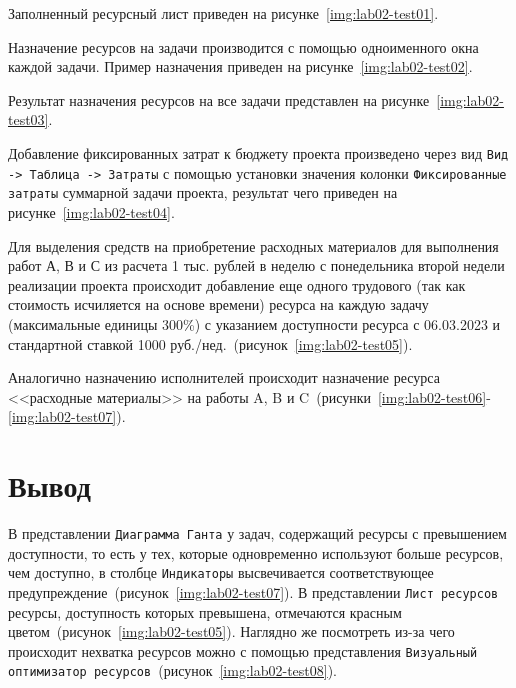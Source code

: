 Заполненный ресурсный лист приведен на рисунке~\ref{img:lab02-test01}.


Назначение ресурсов на задачи производится с помощью одноименного окна каждой
задачи. Пример назначения приведен на рисунке~\ref{img:lab02-test02}.


Результат назначения ресурсов на все задачи представлен на
рисунке~\ref{img:lab02-test03}.


Добавление фиксированных затрат к бюджету проекта произведено через вид
\texttt{Вид -> Таблица -> Затраты} с помощью установки значения колонки
\texttt{Фиксированные затраты} суммарной задачи проекта, результат чего
приведен на рисунке~\ref{img:lab02-test04}.


Для выделения средств на приобретение расходных материалов для выполнения работ
А, В и С из расчета 1 тыс. рублей в неделю с понедельника второй недели
реализации проекта происходит добавление еще одного трудового (так как
стоимость исчиляется на основе времени) ресурса на каждую задачу (максимальные
единицы 300\%) с указанием доступности ресурса с 06.03.2023 и стандартной
ставкой 1000 руб./нед.~(рисунок~\ref{img:lab02-test05}).


Аналогично назначению исполнителей происходит назначение ресурса <<расходные
материалы>> на работы A, B и
C~(рисунки~\ref{img:lab02-test06}-\ref{img:lab02-test07}).



\vspace{-0.5cm}
\section*{Вывод}

В представлении \texttt{Диаграмма Ганта} у задач, содержащий ресурсы с
превышением доступности, то есть у тех, которые одновременно используют больше
ресурсов, чем доступно, в столбце \texttt{Индикаторы} высвечивается
соответствующее предупреждение~(рисунок~\ref{img:lab02-test07}). В представлении
\texttt{Лист ресурсов} ресурсы, доступность которых превышена, отмечаются
красным цветом~(рисунок~\ref{img:lab02-test05}). Наглядно же посмотреть из-за
чего происходит нехватка ресурсов можно с помощью представления
\texttt{Визуальный оптимизатор ресурсов}~(рисунок~\ref{img:lab02-test08}). 


